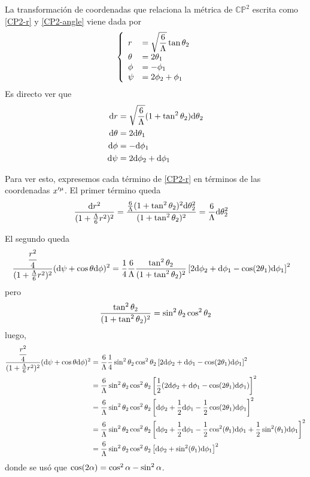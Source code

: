 La transformación de coordenadas que relaciona la métrica de $\mathbb{CP}^2$ escrita como \eqref{CP2-r} y \eqref{CP2-angle}
 viene dada por
\begin{equation}
\left\{
\begin{array}{ll}
  r&=\sqrt{\dfrac{6}{\Lambda}}\tan\theta_2 \\
  \theta&=2\theta_1\\
  \phi&=-\phi_1\\
  \psi&=2\phi_2+\phi_1
  \end{array}
  \right.
\end{equation}
Es directo ver que
\begin{align}
  \dd r&=\sqrt{\dfrac{6}{\Lambda}}(1+\tan^2\theta_2)\dd\theta_2\\
  \dd\theta&=2\dd\theta_1\\
  \dd\phi&=-\dd\phi_1\\
  \dd\psi&=2\dd\phi_2+\dd\phi_1
\end{align}

Para ver esto, expresemos cada término de \eqref{CP2-r} en términos de las coordenadas $x'^\mu $. El primer término queda
\begin{align}
  \frac{\dd r^2}{(1+\frac{\Lambda}{6}r^2)^2}&=\frac{\frac{6}{\Lambda}(1+\tan^2\theta_2)^2\dd\theta_2^2}{(1+\tan^2\theta_2)^2}=\frac{6}{\Lambda}\dd\theta_2^2\label{1}
\end{align}

El segundo queda
\begin{align}
  \frac{\dfrac{r^2}{4}}{(1+\frac{\Lambda}{6}r^2)^2}(\dd\psi+\cos\theta\dd\phi )^2&=\frac{1}{4}\frac{6}{\Lambda}\frac{\tan^2\theta_2}{(1+\tan^2\theta_2)^2}\left[2\dd\phi_2+\dd\phi_1-\cos(2\theta_1)\dd\phi_1\right]^2
\end{align}
pero
\begin{equation}
  \frac{\tan^2\theta_2}{(1+\tan^2\theta_2)^2}=\sin^2\theta_2\cos^2\theta_2
\end{equation}
luego,
\begin{align}
   \frac{\dfrac{r^2}{4}}{(1+\frac{\Lambda}{6}r^2)^2}(\dd\psi+\cos\theta\dd\phi )^2&=\frac{6}{\Lambda}\frac{1}{4}\sin^2\theta_2\cos^2\theta_2\left[2\dd\phi_2+\dd\phi_1-\cos(2\theta_1)\dd\phi_1\right]^2\\
   &=\frac{6}{\Lambda}\sin^2\theta_2\cos^2\theta_2\left[\frac{1}{2}(2\dd\phi_2+\dd\phi_1-\cos(2\theta_1)\dd\phi_1)\right]^2\\
   &=\frac{6}{\Lambda}\sin^2\theta_2\cos^2\theta_2\left[\dd\phi_2+\frac{1}{2}\dd\phi_1-\frac{1}{2}\cos(2\theta_1)\dd\phi_1\right]^2\\
   &=\frac{6}{\Lambda}\sin^2\theta_2\cos^2\theta_2\left[\dd\phi_2+\frac{1}{2}\dd\phi_1-\frac{1}{2}\cos^2(\theta_1)\dd\phi_1+\frac{1}{2}\sin^2(\theta_1)\dd\phi_1\right]^2\\
   &=\frac{6}{\Lambda}\sin^2\theta_2\cos^2\theta_2\left[\dd\phi_2+\sin^2(\theta_1)\dd\phi_1\right]^2\label{2}
\end{align}
donde se usó que $\cos(2\alpha )=\cos^2\alpha -\sin^2\alpha $.

